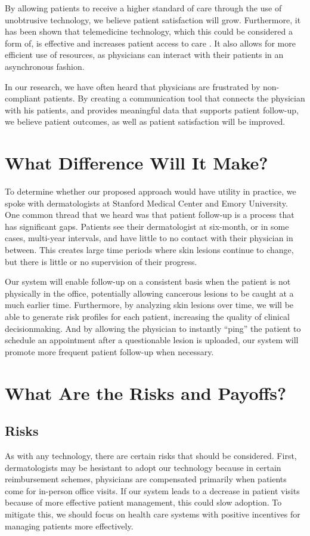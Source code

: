 \documentclass[a4paper,10pt]{article}
\begin{document}
By allowing patients to receive a higher standard of care through the use of
unobtrusive technology, we believe patient satisfaction will grow.
Furthermore, it has been shown that telemedicine technology, which this could be
considered a form of, is effective and increases patient access to care
\cite{hilty2013effectiveness}. It also allows for more efficient use of
resources, as physicians can interact with their patients in an asynchronous
fashion.

In our research, we have often heard that physicians are frustrated by
non-compliant patients. By creating a communication tool that connects the
physician with his patients, and provides meaningful data that supports
patient follow-up, we believe patient outcomes, as well as patient satisfaction
will be improved.

\section{What Difference Will It Make?}
To determine whether our proposed approach would have utility in practice, we
spoke with dermatologists at Stanford Medical Center and Emory University. One
common thread that we heard was that patient follow-up is a process that has
significant gaps. Patients see their dermatologist at six-month, or in some
cases, multi-year intervals, and have little to no contact with their physician
in between. This creates large time periods where skin lesions continue to
change, but there is little or no supervision of their progress.

Our system will enable follow-up on a consistent basis when the patient is not
physically in the office, potentially allowing cancerous lesions to be caught
at a much earlier time. Furthermore, by analyzing skin lesions over time, we
will be able to generate risk profiles for each patient, increasing the
quality of clinical decisionmaking. And by allowing the physician to instantly
``ping'' the patient to schedule an appointment after a questionable lesion
is uploaded, our system will promote more frequent patient follow-up when
necessary.

\section{What Are the Risks and Payoffs?}

\subsection{Risks}
As with any technology, there are certain risks that should be considered.
First, dermatologists may be hesistant to adopt our technology because in
certain reimbursement schemes, physicians are compensated primarily when
patients come for in-person office visits. If our system leads to a decrease
in patient visits because of more effective patient management, this could
slow adoption. To mitigate this, we should focus on health care systems with
positive incentives for managing patients more effectively.
\end{document}
